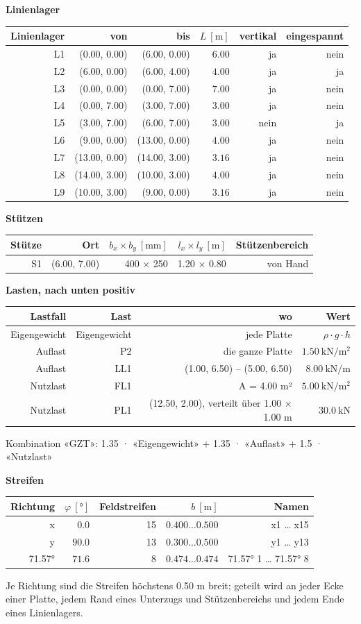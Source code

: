 \documentclass[11pt,a4paper]{article}
\begin{document}
\noindent\textbf{Linienlager}
\begin{longtable}{rrrrrr}
\hline
Linienlager & von & bis & $L\ [\mathrm{m}]$ & vertikal & eingespannt \\
\hline
\endhead
L1 & (0.00, 0.00) & (6.00, 0.00) & $6.00$ & ja & nein \\
L2 & (6.00, 0.00) & (6.00, 4.00) & $4.00$ & ja & ja \\
L3 & (0.00, 0.00) & (0.00, 7.00) & $7.00$ & ja & nein \\
L4 & (0.00, 7.00) & (3.00, 7.00) & $3.00$ & ja & nein \\
L5 & (3.00, 7.00) & (6.00, 7.00) & $3.00$ & nein & ja \\
L6 & (9.00, 0.00) & (13.00, 0.00) & $4.00$ & ja & nein \\
L7 & (13.00, 0.00) & (14.00, 3.00) & $3.16$ & ja & nein \\
L8 & (14.00, 3.00) & (10.00, 3.00) & $4.00$ & ja & nein \\
L9 & (10.00, 3.00) & (9.00, 0.00) & $3.16$ & ja & nein \\
\hline
\end{longtable}
\noindent\textbf{Stützen}
\begin{longtable}{rrrrr}
\hline
Stütze & Ort & $b_x \times b_y\ [\mathrm{mm}]$ & $l_x \times l_y\ [\mathrm{m}]$ & Stützenbereich \\
\hline
\endhead
S1 & (6.00, 7.00) & 400 × 250 & 1.20 × 0.80 & von Hand \\
\hline
\end{longtable}
\noindent\textbf{Lasten, nach unten positiv}
\begin{longtable}{rrrr}
\hline
Lastfall & Last & wo & Wert \\
\hline
\endhead
Eigengewicht & Eigengewicht & jede Platte & $\rho \cdot g \cdot h$ \\
Auflast & P2 & die ganze Platte & $1.50\ \mathrm{kN/m^{2}}$ \\
Auflast & LL1 & (1.00, 6.50) – (5.00, 6.50) & $8.00\ \mathrm{kN/m}$ \\
Nutzlast & FL1 & A = 4.00 m² & $5.00\ \mathrm{kN/m^{2}}$ \\
Nutzlast & PL1 & (12.50, 2.00), verteilt über 1.00 × 1.00 m & $30.0\ \mathrm{kN}$ \\
\hline
\end{longtable}
Kombination «GZT»: 1.35 · «Eigengewicht» + 1.35 · «Auflast» + 1.5 · «Nutzlast»

\noindent\textbf{Streifen}
\begin{longtable}{rrrrr}
\hline
Richtung & $\varphi\ [°]$ & Feldstreifen & $b\ [\mathrm{m}]$ & Namen \\
\hline
\endhead
x & $0.0$ & 15 & $0.400 \ldots 0.500$ & x1 … x15 \\
y & $90.0$ & 13 & $0.300 \ldots 0.500$ & y1 … y13 \\
71.57° & $71.6$ & 8 & $0.474 \ldots 0.474$ & 71.57° 1 … 71.57° 8 \\
\hline
\end{longtable}
Je Richtung sind die Streifen höchstens 0.50 m breit; geteilt wird an jeder Ecke einer Platte, jedem Rand eines Unterzugs und Stützenbereichs und jedem Ende eines Linienlagers.
\end{document}
